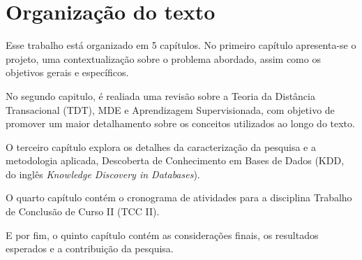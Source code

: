 \section{Organização do texto}

Esse trabalho está organizado em 5 capítulos. No primeiro capítulo apresenta-se
o projeto, uma contextualização sobre o problema abordado, assim como os
objetivos gerais e específicos.

No segundo capitulo, é realiada uma revisão sobre a Teoria da Distância
Transacional (TDT), MDE e Aprendizagem Supervisionada, com objetivo de promover
um maior detalhamento sobre os conceitos utilizados ao longo do texto.

O terceiro capítulo explora os detalhes da caracterização da pesquisa e a
metodologia aplicada, Descoberta de Conhecimento em Bases de Dados (KDD, do
inglês \textit{Knowledge Discovery in Databases}).

O quarto capítulo contém o cronograma de atividades para a disciplina Trabalho
de Conclusão de Curso II (TCC II).

E por fim, o quinto capítulo contém as considerações finais, os resultados
esperados e a contribuição da pesquisa.
